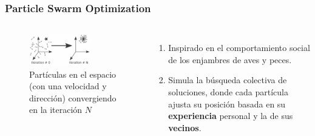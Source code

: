 \begin{frame}
  \frametitle{Particle Swarm Optimization}
  \begin{columns}
    \begin{figure}
      \begin{center}
        \includegraphics[width=0.7\textwidth]{imagenes/chapter3/pso.png}
      \end{center}
      \caption{Partículas en el espacio (con una velocidad y dirección) convergiendo en la iteración $N$}
    \end{figure}
    \begin{enumerate}
      \item Inspirado en el comportamiento social de los enjambres de aves y peces.
      \item Simula la búsqueda colectiva de soluciones, donde cada partícula ajusta su posición basada en su \textbf{experiencia} personal y la de sus \textbf{vecinos}.
    \end{enumerate}
  \end{columns}
\end{frame}

